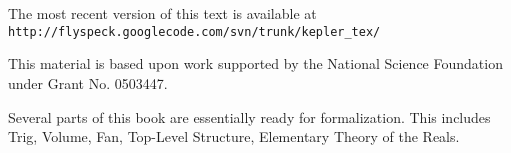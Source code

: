 \noindent
\begin{flushleft}
The most recent version of this text is available at 
{\tt 
http://flyspeck.googlecode.com/svn/trunk/kepler\_tex/}
\end{flushleft}

\bigskip\noindent
This material is based upon work supported by the National Science
Foundation under
Grant No. 0503447.

\bigskip\noindent
Several parts of this book are essentially ready
for formalization.  This includes Trig, Volume, Fan, Top-Level Structure, Elementary Theory of the Reals.

\bigskip\noindent\svninfo 


\smallskip
\newpage

